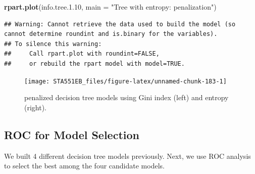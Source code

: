 \documentclass[
]{book}
\newenvironment{Shaded}{\begin{snugshade}}{\end{snugshade}}
\newcommand{\AttributeTok}[1]{\textcolor[rgb]{0.13,0.29,0.53}{#1}}
\newcommand{\FloatTok}[1]{\textcolor[rgb]{0.00,0.00,0.81}{#1}}
\newcommand{\FunctionTok}[1]{\textcolor[rgb]{0.13,0.29,0.53}{\textbf{#1}}}
\newcommand{\NormalTok}[1]{#1}
\newcommand{\StringTok}[1]{\textcolor[rgb]{0.31,0.60,0.02}{#1}}
\begin{document}
\begin{Shaded}
\begin{Highlighting}[]
\FunctionTok{rpart.plot}\NormalTok{(info.tree.}\FloatTok{1.10}\NormalTok{, }\AttributeTok{main =} \StringTok{"Tree with entropy: penalization"}\NormalTok{)}
\end{Highlighting}
\end{Shaded}

\begin{verbatim}
## Warning: Cannot retrieve the data used to build the model (so cannot determine roundint and is.binary for the variables).
## To silence this warning:
##     Call rpart.plot with roundint=FALSE,
##     or rebuild the rpart model with model=TRUE.
\end{verbatim}

\begin{figure}

{\centering \texttt{[image: STA551EB\_files/figure-latex/unnamed-chunk-183-1]} 

}

\caption{penalized decision tree models using Gini index (left) and entropy (right).}\label{fig:unnamed-chunk-183}
\end{figure}

\hypertarget{roc-for-model-selection}{%
\subsection{ROC for Model Selection}\label{roc-for-model-selection}}

We built 4 different decision tree models previously. Next, we use ROC analysis to select the best among the four candidate models.
\end{document}
